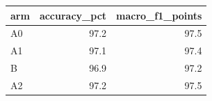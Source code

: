 \begin{tabular}{lrr}
\toprule
arm & accuracy\_pct & macro\_f1\_points \\
\midrule
A0 & 97.2 & 97.5 \\
A1 & 97.1 & 97.4 \\
B & 96.9 & 97.2 \\
A2 & 97.2 & 97.5 \\
\bottomrule
\end{tabular}
